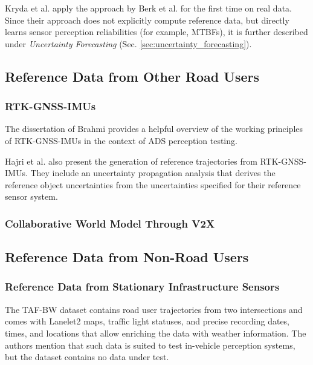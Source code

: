 \documentclass[conference]{IEEEtran}
\newcommand{\citeold}[1]{{\hypersetup{citecolor=black}\cite{#1}}}
\begin{document}
Kryda et al. \cite{Kryda2021} apply the approach by Berk et al. \citeold{berk2019exploiting} for the first time on real data. 
Since their approach does not explicitly compute reference data, but directly learns sensor perception reliabilities (for example, MTBFs), it is further described under \textit{Uncertainty Forecasting} (Sec. \ref{sec:uncertainty_forecasting}).


\subsection{Reference Data from Other Road Users}
\label{sec:data_from_other_tp}

\subsubsection{RTK-GNSS-IMUs}
\label{sec:ref_data_rtk_gnss_imu}

The dissertation of Brahmi \cite{Brahmi2020diss} provides a helpful overview of the working principles of RTK-GNSS-IMUs in the context of ADS perception testing.

Hajri et al. \cite{Hajri2018groundtruth} also present the generation of reference trajectories from RTK-GNSS-IMUs. They include an uncertainty propagation analysis that derives the reference object uncertainties from the uncertainties specified for their reference sensor system. 

\subsubsection{Collaborative World Model Through V2X}
\label{sec:collaborative_world_model}

\subsection{Reference Data from Non-Road Users}
\label{sec:data_from_external}

\subsubsection{Reference Data from Stationary Infrastructure Sensors}

The TAF-BW dataset \cite{Zipfl2020tafbw} contains road user trajectories from two intersections and comes with Lanelet2 maps, traffic light statuses, and precise recording dates, times, and locations that allow enriching the data with weather information.
The authors mention that such data is suited to test in-vehicle perception systems, but the dataset contains no data under test. 
\end{document}
